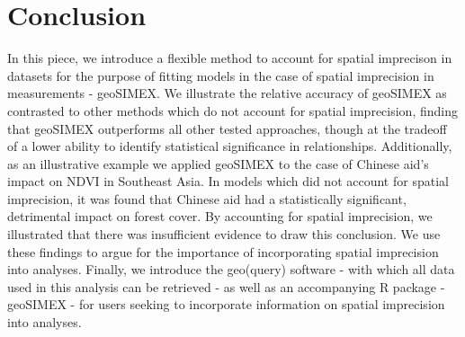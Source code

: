 \section{Conclusion}
In this piece, we introduce a flexible method to account for spatial imprecison in datasets for the purpose of fitting models in the case of spatial imprecision in measurements - geoSIMEX.
We illustrate the relative accuracy of geoSIMEX as contrasted to other methods which do not account for spatial imprecision, finding that geoSIMEX outperforms all other tested approaches, though at the tradeoff of a lower ability to identify statistical significance in relationships.
Additionally, as an illustrative example we applied geoSIMEX to the case of Chinese aid's impact on NDVI in Southeast Asia.  
In models which did not account for spatial imprecision, it was found that Chinese aid had a statistically significant, detrimental impact on forest cover.
By accounting for spatial imprecision, we illustrated that there was insufficient evidence to draw this conclusion.
We use these findings to argue for the importance of incorporating spatial imprecision into analyses.
Finally, we introduce the geo(query) software - with which all data used in this analysis can be retrieved - as well as an accompanying R package - geoSIMEX - for users seeking to incorporate information on spatial imprecision into analyses.
\newpage

